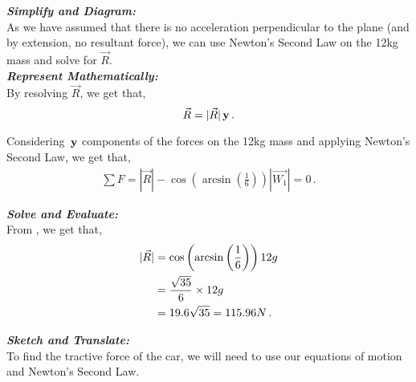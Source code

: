 \begin{subquestions}
\begin{subsubquestions}
	
	\subsubquestion
	
	\textbf{\textit{Simplify and Diagram:}} \\
	As we have assumed that there is no acceleration perpendicular to the plane (and by extension, no resultant force), we can use Newton's Second Law on the 12kg mass and solve for $\vec{R}$.\\
	
	
	
	
	\textbf{\textit{Represent Mathematically:}} \\
	By resolving $\vec{R}$, we get that,
	\begin{equation}
		\vec{R} = |\vec{R}|\,\mathbf{y} \,.
	\end{equation}  
	
	Considering  $\,\mathbf{y}$ components of the forces on the 12kg mass and applying Newton's Second Law, we get that,
	\begin{align}
		\sum F = |\vec{R}|-\cos\left(\arcsin\left(\frac{1}{6}\right)\right)|\vec{W_1}| = 0 \label{2006:q5:REqn1}\,.
	\end{align}
	
	
	
	
	\textbf{\textit{Solve and Evaluate:}} \\
	From , we get that,
	\begin{align}
		|\vec{R}| & = \cos\left(\arcsin\left(\frac{1}{6}\right)\right)12g \nonumber \\
		          & = \frac{\sqrt{35}}{6}\times 12g \nonumber \\
		          & = 19.6\sqrt{35} = 115.96N \,. 
	\end{align}
	
\end{subsubquestions}	
	
	
\subquestion

\textbf{\textit{Sketch and Translate:}} \\
To find the tractive force of the car, we will need to use our equations of motion and Newton's Second Law.\\





\end{subquestions}
